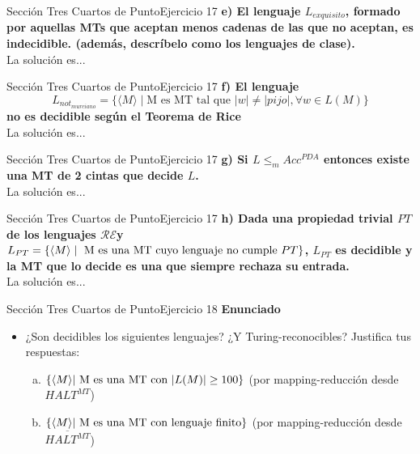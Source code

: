 \documentclass[10pt, envcountsect, presentation, aspectratio=169]{beamer}
\newcommand{\lr}{\ensuremath{\mathcal {RE}}}
\begin{document}

\begin{frame}{Sección Tres Cuartos de Punto}{Ejercicio 17}
    \textbf{e) El lenguaje $L_{exquisito}$, formado por aquellas MTs que aceptan menos cadenas de las que no aceptan, es indecidible. (además, descríbelo como los lenguajes de clase).}\\
    La solución es...
\end{frame}


\begin{frame}{Sección Tres Cuartos de Punto}{Ejercicio 17}
    \textbf{f) El lenguaje $$L_{not_{murciano}}=\{\langle M \rangle \mid \mbox{M es MT  tal que } |w|\neq |pijo|,  \forall w \in L(M) \}$$  no es decidible según el Teorema de Rice}\\
    La solución es...
\end{frame}


\begin{frame}{Sección Tres Cuartos de Punto}{Ejercicio 17}
    \textbf{g) Si $L\le_m  Acc^{PDA}$ entonces existe una MT de 2 cintas que decide $L$. }\\
    La solución es...
\end{frame}


\begin{frame}{Sección Tres Cuartos de Punto}{Ejercicio 17}
    \textbf{h) Dada  una propiedad trivial $PT$ de los lenguajes \lr y $L_{PT}=\{\langle M \rangle \mid \hbox{ M es una MT cuyo lenguaje no cumple } PT\}$, $L_{PT}$ es decidible y la MT que lo decide es una que siempre rechaza su entrada.}\\
    La solución es...
\end{frame}


\begin{frame}{Sección Tres Cuartos de Punto}{Ejercicio 18}
    \textbf{Enunciado}
    \begin{itemize}
        \item ¿Son decidibles los siguientes lenguajes? ¿Y Turing-reconocibles? Justifica tus respuestas:
        \begin{enumerate}[a)]
            \item $\{\langle M \rangle \hbox{| M es una MT con } |L(M)| \geq 100\}$ (por mapping-reducción desde $HALT^{MT}$)
            \item $\{\langle M \rangle \hbox{| M es una MT con lenguaje finito}  \}$ (por mapping-reducción desde $\overline{HALT^{MT}}$)
        \end{enumerate}
    \end{itemize}
\end{frame}
\end{document}
